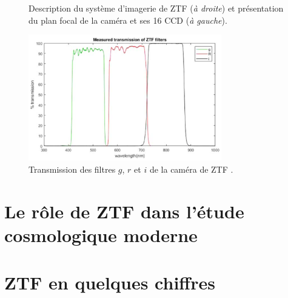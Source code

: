 \documentclass[../main/main.tex]{subfiles}
\begin{document}
\begin{figure}[ht]
\centering
{}\hfill
{}
\caption{Description du système d'imagerie de ZTF (\textit{à droite}) et présentation du
  plan focal de la caméra et ses 16 CCD (\textit{à gauche}). }
\label{fig:subfigures}
\end{figure}

\begin{figure}
  \centering
  \includegraphics[width=0.75\textwidth]{../figures/02_ztf/ztffilters.png}
  \caption{Transmission des filtres $g$, $r$ et $i$ de la caméra de ZTF \citep{DekanyZTF2020}.}
\label{fig:ztffilters}
\end{figure}


\section{Le rôle de ZTF dans l'étude cosmologique moderne}

\section{ZTF en quelques chiffres}
\end{document}
